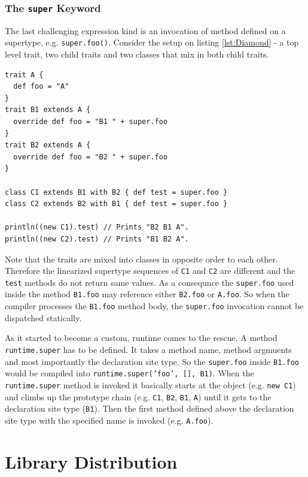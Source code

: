 \documentclass[12pt,a4paper]{report}
\begin{document}
\subsubsection*{The \texttt{super} Keyword}

The last challenging expression kind is an invocation of method defined on a supertype, e.g. \texttt{super.foo()}. Consider the setup on listing \ref{lst:Diamond} - a top level trait, two child traits and two classes that mix in both child traits.

\begin{lstlisting}[caption={The \texttt{super} keyword non-static behavior example.},label={lst:Diamond}]
trait A { 
  def foo = "A" 
}
trait B1 extends A { 
  override def foo = "B1 " + super.foo
}
trait B2 extends A { 
  override def foo = "B2 " + super.foo
}

class C1 extends B1 with B2 { def test = super.foo }
class C2 extends B2 with B1 { def test = super.foo }

println((new C1).test) // Prints "B2 B1 A".
println((new C2).test) // Prints "B1 B2 A".
\end{lstlisting}

Note that the traits are mixed into classes in opposite order to each other. Therefore the linearized supertype sequences of \texttt{C1} and \texttt{C2} are different and the \texttt{test} methods do not return same values. As a consequnce the \texttt{super.foo} used inside the method \texttt{B1.foo} may reference either \texttt{B2.foo} or \texttt{A.foo}. So when the compiler processes the \texttt{B1.foo} method body, the \texttt{super.foo} invocation cannot be dispatched statically.

As it started to become a custom, runtime comes to the rescue. A method \texttt{runtime.super} has to be defined. It takes a method name, method argmuents and most importantly the declaration site type. So the \texttt{super.foo} inside \texttt{B1.foo} would be compiled into \texttt{runtime.super('foo', [], B1)}. When the \texttt{runtime.super} method is invoked it basically starts at the object (e.g. \texttt{new C1}) and climbs up the prototype chain (e.g. \texttt{C1}, \texttt{B2}, \texttt{B1}, \texttt{A}) until it gets to the declaration site type (\texttt{B1}). Then the first method defined above the declaration site type with the specified name is invoked (e.g. \texttt{A.foo}).

\section{Library Distribution}
\end{document}
